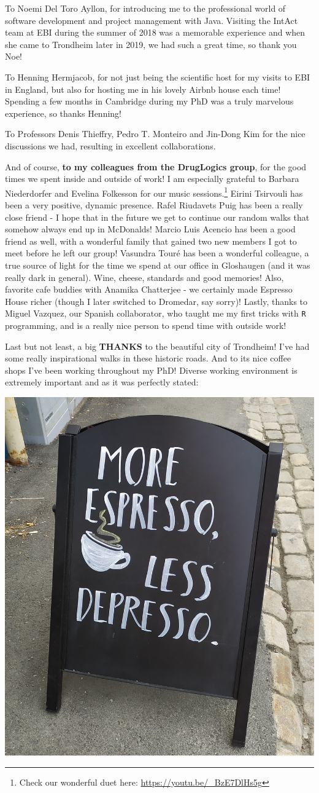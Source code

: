 \documentclass[
  12pt,
]{book}
\begin{document}
To Noemi Del Toro Ayllon, for introducing me to the professional world of software development and project management with Java. Visiting the IntAct team at EBI during the summer of 2018 was a memorable experience and when she came to Trondheim later in 2019, we had such a great time, so thank you Noe!

\newpage

To Henning Hermjacob, for not just being the scientific host for my visits to EBI in England, but also for hosting me in his lovely Airbnb house each time! Spending a few months in Cambridge during my PhD was a truly marvelous experience, so thanks Henning!

To Professors Denis Thieffry, Pedro T. Monteiro and Jin-Dong Kim for the nice discussions we had, resulting in excellent collaborations.

And of course, \textbf{to my colleagues from the DrugLogics group}, for the good times we spent inside and outside of work! I am especially grateful to Barbara Niederdorfer and Evelina Folkesson for our music sessions.\footnote{Check our wonderful duet here: \url{https://youtu.be/_BzE7DlHs5g}} Eirini Tsirvouli has been a very positive, dynamic presence. Rafel Riudavets Puig has been a really close friend - I hope that in the future we get to continue our random walks that somehow always end up in McDonalds! Marcio Luis Acencio has been a good friend as well, with a wonderful family that gained two new members I got to meet before he left our group! Vasundra Touré has been a wonderful colleague, a true source of light for the time we spend at our office in Gloshaugen (and it was really dark in general). Wine, cheese, standards and good memories! Also, favorite cafe buddies with Anamika Chatterjee - we certainly made Espresso House richer (though I later switched to Dromedar, say sorry)! Lastly, thanks to Miguel Vazquez, our Spanish collaborator, who taught me my first tricks with \texttt{R} programming, and is a really nice person to spend time with outside work!

Last but not least, a big \textbf{THANKS} to the beautiful city of Trondheim! I've had some really inspirational walks in these historic roads. And to its nice coffee shops I've been working throughout my PhD! Diverse working environment is extremely important and as it was perfectly stated:

\begin{center}\includegraphics[width=0.4\linewidth]{img/depresso} \end{center}
\end{document}
